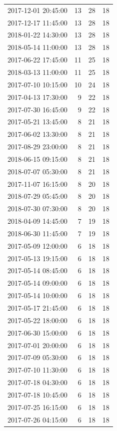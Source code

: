 \begin{tabular}{lrrr}
2017-12-01 20:45:00 & 13 & 28 & 18 \\
2017-12-17 11:45:00 & 13 & 28 & 18 \\
2018-01-22 14:30:00 & 13 & 28 & 18 \\
2018-05-14 11:00:00 & 13 & 28 & 18 \\
2017-06-22 17:45:00 & 11 & 25 & 18 \\
2018-03-13 11:00:00 & 11 & 25 & 18 \\
2017-07-10 10:15:00 & 10 & 24 & 18 \\
2017-04-13 17:30:00 & 9 & 22 & 18 \\
2017-07-30 16:45:00 & 9 & 22 & 18 \\
2017-05-21 13:45:00 & 8 & 21 & 18 \\
2017-06-02 13:30:00 & 8 & 21 & 18 \\
2017-08-29 23:00:00 & 8 & 21 & 18 \\
2018-06-15 09:15:00 & 8 & 21 & 18 \\
2018-07-07 05:30:00 & 8 & 21 & 18 \\
2017-11-07 16:15:00 & 8 & 20 & 18 \\
2018-07-29 05:45:00 & 8 & 20 & 18 \\
2018-07-30 07:30:00 & 8 & 20 & 18 \\
2018-04-09 14:45:00 & 7 & 19 & 18 \\
2018-06-30 11:45:00 & 7 & 19 & 18 \\
2017-05-09 12:00:00 & 6 & 18 & 18 \\
2017-05-13 19:15:00 & 6 & 18 & 18 \\
2017-05-14 08:45:00 & 6 & 18 & 18 \\
2017-05-14 09:00:00 & 6 & 18 & 18 \\
2017-05-14 10:00:00 & 6 & 18 & 18 \\
2017-05-17 21:45:00 & 6 & 18 & 18 \\
2017-05-22 18:00:00 & 6 & 18 & 18 \\
2017-06-30 15:00:00 & 6 & 18 & 18 \\
2017-07-01 20:00:00 & 6 & 18 & 18 \\
2017-07-09 05:30:00 & 6 & 18 & 18 \\
2017-07-10 11:30:00 & 6 & 18 & 18 \\
2017-07-18 04:30:00 & 6 & 18 & 18 \\
2017-07-18 10:45:00 & 6 & 18 & 18 \\
2017-07-25 16:15:00 & 6 & 18 & 18 \\
2017-07-26 04:15:00 & 6 & 18 & 18 \\

\end{tabular}
